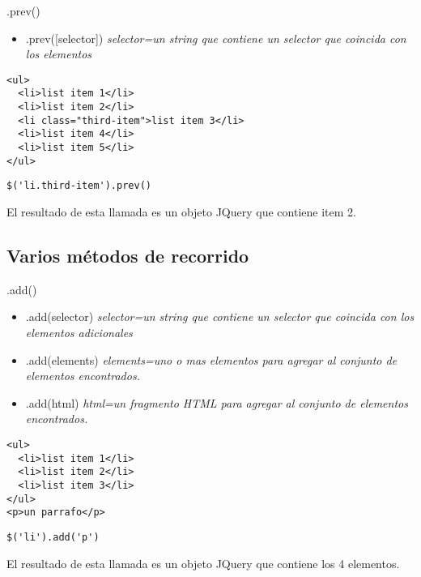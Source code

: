 \begin{frame}[fragile]{.prev()} %
\begin{itemize}
    \item .prev([selector]) \textit{ selector=un string que contiene un selector que coincida con los elementos }
\end{itemize}
\begin{lstlisting}
<ul>
  <li>list item 1</li>
  <li>list item 2</li>
  <li class="third-item">list item 3</li>
  <li>list item 4</li>
  <li>list item 5</li>
</ul>
\end{lstlisting}
\begin{lstlisting}
$('li.third-item').prev()
\end{lstlisting}
El resultado de esta llamada es un objeto JQuery que contiene item 2.
\end{frame}

\subsection{Varios métodos de recorrido} %

\begin{frame}[fragile]{.add()} %
\begin{itemize}
    \item .add(selector) \textit{ selector=un string que contiene un selector que coincida con los elementos adicionales}
    \item .add(elements) \textit{ elements=uno o mas elementos para agregar al
    conjunto de elementos encontrados.}
    \item .add(html) \textit{ html=un fragmento HTML para agregar al conjunto
    de elementos encontrados.}
\end{itemize}
\begin{lstlisting}
<ul>
  <li>list item 1</li>
  <li>list item 2</li>
  <li>list item 3</li>
</ul>
<p>un parrafo</p>
\end{lstlisting}
\begin{lstlisting}
$('li').add('p')
\end{lstlisting}
El resultado de esta llamada es un objeto JQuery que contiene los 4 elementos.
\end{frame}

